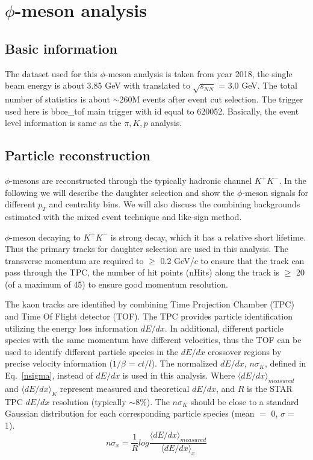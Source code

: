 \section{$\phi$-meson analysis} 
\subsection{Basic information}

The dataset used for this $\phi$-meson analysis is taken from year 2018, the single beam energy is about 3.85 GeV with translated to $\sqrt{s_{NN}}$ = 3.0 GeV. The total number of statistics is about $\sim$260M events after event cut selection. The trigger used here is bbce\_tof main trigger with id equal to 620052. Basically, the event level information is same as the $\pi,K,p$ analysis.

\subsection{Particle reconstruction}

$\phi$-mesons are reconstructed through the typically hadronic channel $K^{+}K^{-}$. In the following we will describe the daughter selection and show the $\phi$-meson signals for different $p_T$ and centrality bins. We will also discuss the combining backgrounds estimated with the mixed event technique and like-sign method.

$\phi$-meson decaying to $K^{+}K^{-}$ is strong decay, which it has a relative short lifetime. Thus the primary tracks for daughter selection are used in this analysis. The transverse momentum are required to $\geq$ 0.2 GeV/$c$ to ensure that the track can pass through the TPC, the number of hit points (nHits) along the track is $\geq$ 20 (of a maximum of 45) to ensure good momentum resolution.

The kaon tracks are identified by combining Time Projection Chamber (TPC) and Time Of Flight detector (TOF). The TPC provides particle identification utilizing the energy loss information $dE/dx$. In additional, different particle species with the same momentum have different velocities, thus the TOF can be used to identify different particle species in the $dE/dx$ crossover regions by precise velocity information ($1/\beta$ = $ct/l$). The normalized $dE/dx$, $n\sigma_K$, defined in Eq.~\ref{nsigma}, instead of $dE/dx$ is used in this analysis. Where $\langle{dE/dx}\rangle_{measured}$ and $\langle{dE/dx}\rangle_{K}$ represent measured and theoretical $dE/dx$, and $R$ is the STAR TPC $dE/dx$ resolution (typically $\sim$8\%). The $n\sigma_K$ should be close to a standard Gaussian distribution for each corresponding particle species (mean $=$ 0, $\sigma = $ 1).
\begin{equation}
  n\sigma_x = \frac{1}{R}log\frac{\langle{dE/dx}\rangle_{measured}}{\langle{dE/dx}\rangle_{x}}
\label{nsigma}
\end{equation}

